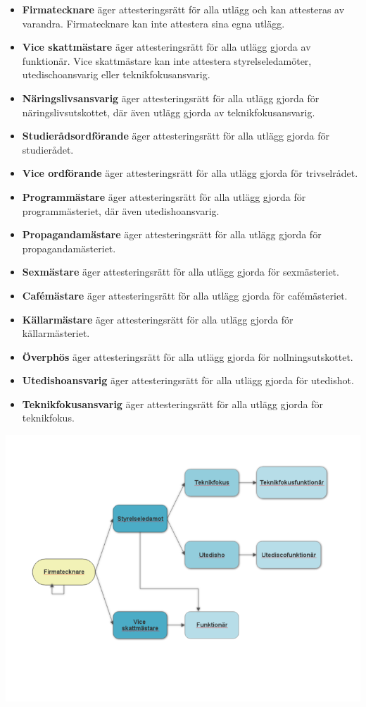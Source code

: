\documentclass{dsekkallelse}
\begin{document}
\begin{itemize}
\item \textbf{Firmatecknare} äger attesteringsrätt för alla utlägg och kan attesteras av varandra. Firmatecknare kan inte attestera sina egna utlägg. 
\item \textbf{Vice skattmästare} äger attesteringsrätt för alla utlägg gjorda av funktionär. Vice skattmästare kan inte attestera styrelseledamöter, utedischoansvarig eller teknikfokusansvarig. 
\item \textbf{Näringslivsansvarig} äger attesteringsrätt för alla utlägg gjorda för näringslivsutskottet, där även utlägg gjorda av teknikfokusansvarig. 
\item \textbf{Studierådsordförande} äger attesteringsrätt för alla utlägg gjorda för studierådet. 
\item \textbf{Vice ordförande} äger attesteringsrätt för alla utlägg gjorda för trivselrådet. 
\item \textbf{Programmästare} äger attesteringsrätt för alla utlägg gjorda för programmästeriet, där även utedishoansvarig. 
\item \textbf{Propagandamästare} äger attesteringsrätt för alla utlägg gjorda för propagandamästeriet. 
\item \textbf{Sexmästare} äger attesteringsrätt för alla utlägg gjorda för sexmästeriet. 
\item \textbf{Cafémästare} äger attesteringsrätt för alla utlägg gjorda för cafémästeriet.
\item \textbf{Källarmästare} äger attesteringsrätt för alla utlägg gjorda för källarmästeriet. 
\item \textbf{Överphös} äger attesteringsrätt för alla utlägg gjorda för nollningsutskottet. 
\item \textbf{Utedishoansvarig} äger attesteringsrätt för alla utlägg gjorda för utedishot. 
\item \textbf{Teknikfokusansvarig} äger attesteringsrätt för alla utlägg gjorda för teknikfokus. 
\end{itemize}

\includegraphics[width=\textwidth]{flow.png}

\end{document}
